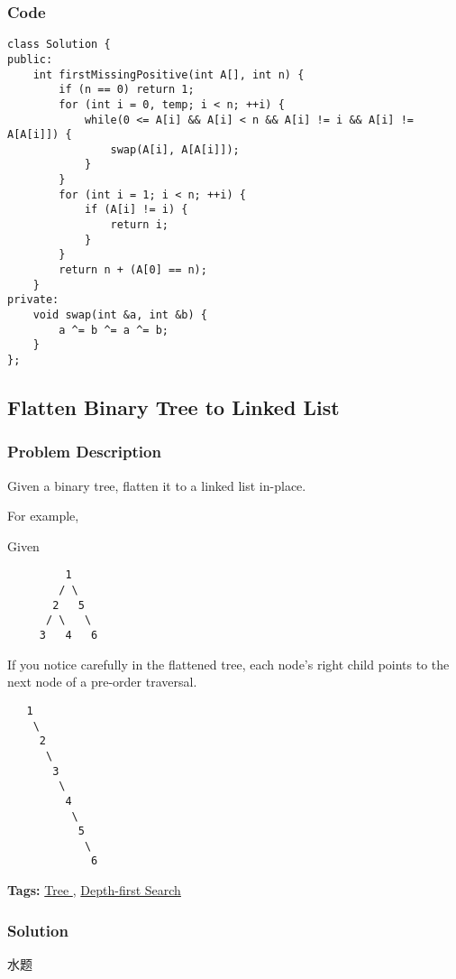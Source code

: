 \documentclass{article}
\begin{document}
\begin{CJK*}{UTF8}{gkai}
\subsubsection*{Code}
\begin{lstlisting}
class Solution {
public:
    int firstMissingPositive(int A[], int n) {
        if (n == 0) return 1;
        for (int i = 0, temp; i < n; ++i) {
            while(0 <= A[i] && A[i] < n && A[i] != i && A[i] != A[A[i]]) {
                swap(A[i], A[A[i]]);
            }
        }
        for (int i = 1; i < n; ++i) {
            if (A[i] != i) {
                return i;
            }
        }
        return n + (A[0] == n);
    }
private:
    void swap(int &a, int &b) {
        a ^= b ^= a ^= b;
    }
}; 
\end{lstlisting}


\subsection{ Flatten Binary Tree to Linked List }
\label{ Flatten Binary Tree to Linked List }

\subsubsection*{Problem Description}
Given a binary tree, flatten it to a linked list in-place.

For example,


Given
\begin{verbatim}
         1
        / \
       2   5
      / \   \
     3   4   6
\end{verbatim}

If you notice carefully in the flattened tree, each node's right child points to the next node of a pre-order traversal.

\begin{verbatim}
   1
    \
     2
      \
       3
        \
         4
          \
           5
            \
             6
\end{verbatim}

\textbf{Tags: }
\hyperref[ Tree ]{ Tree },  \hyperref[ Depth-first Search ]{ Depth-first Search }



\subsubsection*{Solution}
水题


\end{CJK*}
\end{document}

